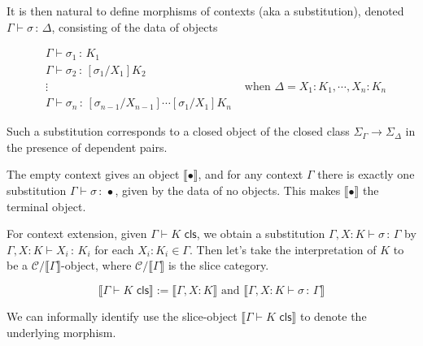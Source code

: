 \message{ !name(LF+Equality_LCCC.tex)}\documentclass{article}
\newcommand{\bbrkt}[1]{\llbracket #1 \rrbracket}
\newcommand{\Subst}[3]{[#1 / #2] #3}
\newcommand{\CtxExt}[3]{#1,#2 : #3}
\newcommand{\CtxJdg}[1]{#1 \vdash \mathsf{ctx}}
\newcommand{\ClsJdg}[2]{#1 \vdash #2 \,\, \mathsf{cls}}
\newcommand{\ObjJdg}[3]{#1 \vdash #2 \, : \, #3 }
\newcommand{\<}{\langle}
\renewcommand{\>}{\rangle}
\newcommand{\si}{\sigma}
\newcommand{\Ga}{\Gamma}
\newcommand{\De}{\Delta}
\newcommand{\Si}{\Sigma}
\newcommand{\CC}{\mathcal{C}}
\newcommand{\TERM}{\mathbf{1}}
\theoremstyle{definitionstyle}
\theoremstyle{exercisestyle}
\theoremstyle{remarkstyle}
\begin{document}
\begin{multicols}{2}
  \color{syntax}{
  \[\CtxJdg{\Ga}\]}

  \color{semantics}{
  \[\bbrkt{\Ga} \in \CC\]
  }
\end{multicols}

It is then natural to define morphisms of contexts (aka a substitution),
denoted $\ObjJdg{\Ga}{\si}{\De}$,
consisting of the data of objects

\begin{align*}
  &\ObjJdg{\Ga}{\si_{1}}{K_{1}}\\
  &\ObjJdg{\Ga}{\si_{2}}{\Subst{\si_{1}}{X_{1}}{K_{2}}}\\
  &\vdots & \text{ when } \De = \CtxExt{X_{1}:K_{1}}{\cdots, X_{n}}{K_{n}}\\
  &\ObjJdg{\Ga}{\si_{n}}{\Subst{\si_{n-1}}{X_{n-1}}{\cdots \Subst{\si_{1}}{X_{1}}{K_{n}}}}
\end{align*}

Such a substitution corresponds to a closed object of the closed class
$\Si_{\Ga} \to \Si_{\De}$ in the presence of dependent pairs.

\begin{multicols}{2}
  \color{syntax}{
  \[\ObjJdg{\Ga}{\si}{\De}\]}

  \color{semantics}{
  \[\bbrkt{\si} : \bbrkt{\Ga} \to \bbrkt{\De}\]
  }
\end{multicols}

The empty context gives an object $\bbrkt{\bullet}$,
and for any context $\Ga$ there is exactly one substitution $\ObjJdg{\Ga}{\si}{\bullet}$,
given by the data of no objects.
This makes $\bbrkt{\bullet}$ the terminal object.

\begin{multicols}{2}
  \color{syntax}{
  \[\infer[\textsc{ctx-emp}]{\CtxJdg{\bullet}}{}\]}

  \color{semantics}{
  \[\TERM_{\CC} \in \CC\]
  }
\end{multicols}

For context extension, given $\ClsJdg{\Ga}{K}$,
we obtain a substitution $\ObjJdg{\CtxExt{\Ga}{X}{K}}{\si}{\Ga}$
by $\ObjJdg{\CtxExt{\Ga}{X}{K}}{X_{i}}{K_{i}}$ for each $X_{i} : K_{i} \in \Ga$.
Then let's take the interpretation of $K$ to be a $\CC/\bbrkt{\Ga}$-object,
where $\CC/\bbrkt{\Ga}$ is the slice category.

\[ \bbrkt{\ClsJdg{\Ga}{K}} := \bbrkt{\CtxExt{\Ga}{X}{K}} \text{ and } \bbrkt{\ObjJdg{\CtxExt{\Ga}{X}{K}}{\si}{\Ga}}\]

We can informally identify use the slice-object $\bbrkt{\ClsJdg{\Ga}{K}}$ to denote the underlying morphism.
\end{document}
